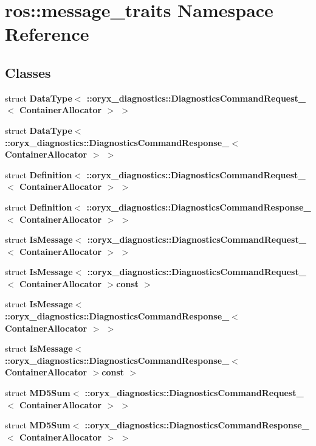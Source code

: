 \section{ros\-:\-:message\-\_\-traits \-Namespace \-Reference}
\label{namespaceros_1_1message__traits}
\subsection*{\-Classes}
\begin{DoxyCompactItemize}
\item 
struct {\bf \-Data\-Type$<$ \-::oryx\-\_\-diagnostics\-::\-Diagnostics\-Command\-Request\-\_\-$<$ Container\-Allocator $>$ $>$}
\item 
struct {\bf \-Data\-Type$<$ \-::oryx\-\_\-diagnostics\-::\-Diagnostics\-Command\-Response\-\_\-$<$ Container\-Allocator $>$ $>$}
\item 
struct {\bf \-Definition$<$ \-::oryx\-\_\-diagnostics\-::\-Diagnostics\-Command\-Request\-\_\-$<$ Container\-Allocator $>$ $>$}
\item 
struct {\bf \-Definition$<$ \-::oryx\-\_\-diagnostics\-::\-Diagnostics\-Command\-Response\-\_\-$<$ Container\-Allocator $>$ $>$}
\item 
struct {\bf \-Is\-Message$<$ \-::oryx\-\_\-diagnostics\-::\-Diagnostics\-Command\-Request\-\_\-$<$ Container\-Allocator $>$ $>$}
\item 
struct {\bf \-Is\-Message$<$ \-::oryx\-\_\-diagnostics\-::\-Diagnostics\-Command\-Request\-\_\-$<$ Container\-Allocator $>$const  $>$}
\item 
struct {\bf \-Is\-Message$<$ \-::oryx\-\_\-diagnostics\-::\-Diagnostics\-Command\-Response\-\_\-$<$ Container\-Allocator $>$ $>$}
\item 
struct {\bf \-Is\-Message$<$ \-::oryx\-\_\-diagnostics\-::\-Diagnostics\-Command\-Response\-\_\-$<$ Container\-Allocator $>$const  $>$}
\item 
struct {\bf \-M\-D5\-Sum$<$ \-::oryx\-\_\-diagnostics\-::\-Diagnostics\-Command\-Request\-\_\-$<$ Container\-Allocator $>$ $>$}
\item 
struct {\bf \-M\-D5\-Sum$<$ \-::oryx\-\_\-diagnostics\-::\-Diagnostics\-Command\-Response\-\_\-$<$ Container\-Allocator $>$ $>$}
\end{DoxyCompactItemize}
